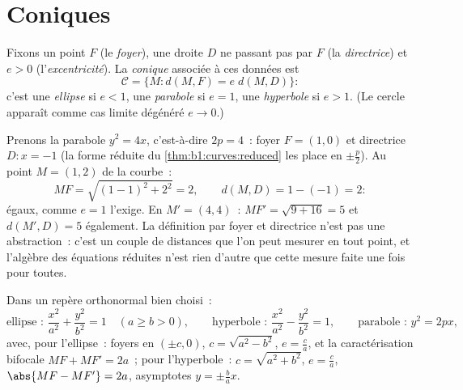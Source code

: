 \section{Coniques}

\begin{definition}\label{def:b1:curves:conics}
Fixons un point $F$ (le \emph{foyer}), une droite $D$ ne passant pas
par $F$ (la \emph{directrice}) et $e > 0$ (l'\emph{excentricité}). La
\emph{conique} associée à ces données est
\[
\mathcal{C} = \{M : d(M, F) = e\; d(M, D)\}:
\]
c'est une \emph{ellipse} si $e < 1$, une \emph{parabole} si $e = 1$,
une \emph{hyperbole} si $e > 1$. (Le cercle apparaît comme cas limite
dégénéré $e \to 0$.)
\end{definition}

\begin{example}
\label{ex:b1:curves:parabolacheck}
Prenons la parabole $y^2 = 4x$, c'est-à-dire $2p = 4$~: foyer $F = (1, 0)$
et directrice $D : x = -1$ (la forme réduite du
\cref{thm:b1:curves:reduced} les place en $\pm\frac p2$). Au
point $M = (1, 2)$ de la courbe~:
\[
MF = \sqrt{(1-1)^2 + 2^2} = 2,
\qquad
d(M, D) = 1 - (-1) = 2 :
\]
égaux, comme $e = 1$ l'exige. En $M' = (4, 4)$~: $MF' = \sqrt{9 +
16} = 5$ et $d(M', D) = 5$ également. La définition par foyer et
directrice n'est pas une abstraction~: c'est un couple de distances
que l'on peut mesurer en tout point, et l'algèbre des équations
réduites n'est rien d'autre que cette mesure faite une fois pour
toutes.
\end{example}

\begin{theorem}\label{thm:b1:curves:reduced}
Dans un repère orthonormal bien choisi~:
\[
\text{ellipse~: } \frac{x^2}{a^2} + \frac{y^2}{b^2} = 1
\quad (a \geq b > 0),
\qquad
\text{hyperbole~: } \frac{x^2}{a^2} - \frac{y^2}{b^2} = 1,
\qquad
\text{parabole~: } y^2 = 2px,
\]
avec, pour l'ellipse~: foyers en $(\pm c, 0)$, $c = \sqrt{a^2 - b^2}$,
$e = \frac ca$, et la caractérisation bifocale $MF + MF' = 2a$~;
pour l'hyperbole~: $c = \sqrt{a^2 + b^2}$, $e = \frac ca$,
$\abs{MF - MF'} = 2a$, asymptotes $y = \pm\frac ba x$.
\end{theorem}

